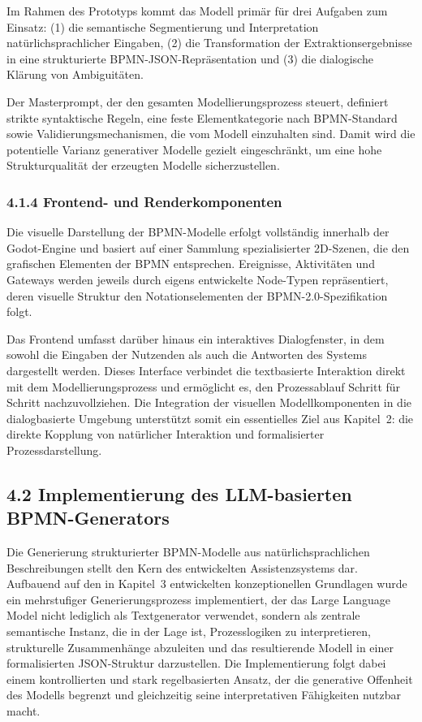 \documentclass[a4paper,12pt]{scrreprt}
\begin{document}
Im Rahmen des Prototyps kommt das Modell primär für drei Aufgaben zum Einsatz:
(1) die semantische Segmentierung und Interpretation natürlichsprachlicher Eingaben,  
(2) die Transformation der Extraktionsergebnisse in eine strukturierte BPMN-JSON-Repräsentation  
und (3) die dialogische Klärung von Ambiguitäten.  

Der Masterprompt, der den gesamten Modellierungsprozess steuert, definiert strikte syntaktische Regeln, eine feste Elementkategorie nach BPMN-Standard sowie Validierungsmechanismen, die vom Modell einzuhalten sind. Damit wird die 
potentielle Varianz generativer Modelle gezielt eingeschränkt, um eine hohe Strukturqualität der erzeugten Modelle sicherzustellen.

\subsubsection*{4.1.4 Frontend- und Renderkomponenten}

Die visuelle Darstellung der BPMN-Modelle erfolgt vollständig innerhalb der Godot-Engine und basiert auf einer Sammlung spezialisierter 2D-Szenen, die den grafischen Elementen der BPMN entsprechen. Ereignisse, Aktivitäten und Gateways werden jeweils durch eigens entwickelte Node-Typen repräsentiert, deren visuelle Struktur den Notationselementen der BPMN-2.0-Spezifikation folgt. 

Das Frontend umfasst darüber hinaus ein interaktives Dialogfenster, in dem sowohl die Eingaben der Nutzenden als auch die Antworten des Systems dargestellt werden. Dieses Interface verbindet die textbasierte Interaktion direkt mit dem Modellierungsprozess und ermöglicht es, den Prozessablauf Schritt für Schritt nachzuvollziehen. Die Integration der visuellen Modellkomponenten in die dialogbasierte Umgebung unterstützt somit ein essentielles Ziel aus Kapitel~2: die direkte Kopplung von natürlicher Interaktion und formalisierter Prozessdarstellung.

\subsection*{4.2 Implementierung des LLM-basierten BPMN-Generators}

Die Generierung strukturierter BPMN-Modelle aus natürlichsprachlichen Beschreibungen stellt den Kern des entwickelten Assistenzsystems dar. Aufbauend auf den in Kapitel~3 entwickelten konzeptionellen Grundlagen wurde ein mehrstufiger Generierungsprozess implementiert, der das Large Language Model nicht lediglich als Textgenerator verwendet, sondern als zentrale semantische Instanz, die in der Lage ist, Prozesslogiken zu interpretieren, strukturelle Zusammenhänge abzuleiten und das resultierende Modell in einer formalisierten JSON-Struktur darzustellen. Die Implementierung folgt dabei einem kontrollierten und stark regelbasierten Ansatz, der die generative Offenheit des Modells begrenzt und gleichzeitig seine interpretativen Fähigkeiten nutzbar macht.
\end{document}
